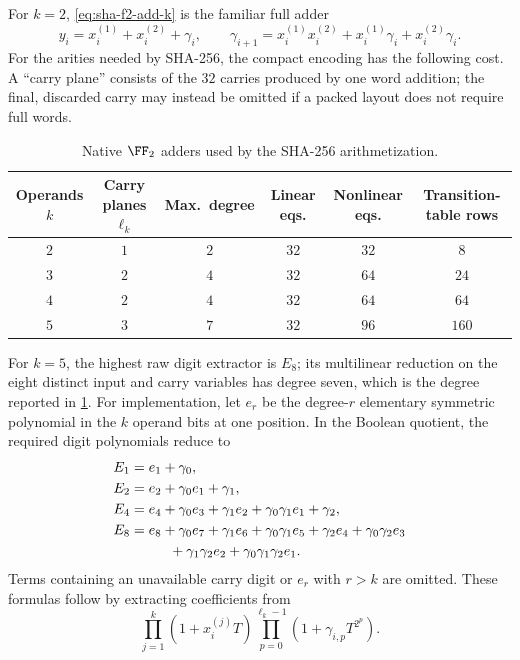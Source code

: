 For $k=2$, \eqref{eq:sha-f2-add-k} is the familiar full adder
\begin{equation}\label{eq:sha-f2-full-adder}
  y_i=x_i^{(1)}+x_i^{(2)}+\gamma_i,
  \qquad
  \gamma_{i+1}
   =x_i^{(1)}x_i^{(2)}
    +x_i^{(1)}\gamma_i+x_i^{(2)}\gamma_i.
\end{equation}
For the arities needed by SHA-256, the compact encoding has the following
cost.  A ``carry plane'' consists of the $32$ carries produced by one word
addition; the final, discarded carry may instead be omitted if a packed
layout does not require full words.
\begin{table}[H]
\centering
\small
\caption{Native $\FF_2$ adders used by the SHA-256 arithmetization.}
\label{tab:sha-f2-adders}
\begin{tabular}{@{}cccccc@{}}
\toprule
Operands $k$ & Carry planes $\ell_k$ & Max.\ degree
  & Linear eqs. & Nonlinear eqs. & Transition-table rows\\
\midrule
$2$ & $1$ & $2$ & $32$ & $32$ & $8$\\
$3$ & $2$ & $4$ & $32$ & $64$ & $24$\\
$4$ & $2$ & $4$ & $32$ & $64$ & $64$\\
$5$ & $3$ & $7$ & $32$ & $96$ & $160$\\
\bottomrule
\end{tabular}
\end{table}
For $k=5$, the highest raw digit extractor is $E_8$; its multilinear
reduction on the eight distinct input and carry variables has degree seven,
which is the degree reported in \cref{tab:sha-f2-adders}.
For implementation, let $e_r$ be the degree-$r$ elementary symmetric
polynomial in the $k$ operand bits at one position.  In the Boolean quotient,
the required digit polynomials reduce to
\begin{equation}\label{eq:sha-f2-reduced-digits}
\begin{aligned}
E_1&=e_1+\gamma_0,\\
E_2&=e_2+\gamma_0e_1+\gamma_1,\\
E_4&=e_4+\gamma_0e_3+\gamma_1e_2
       +\gamma_0\gamma_1e_1+\gamma_2,\\
E_8&=e_8+\gamma_0e_7+\gamma_1e_6+\gamma_0\gamma_1e_5
       +\gamma_2e_4+\gamma_0\gamma_2e_3\\
   &\hspace{2.8em}+\gamma_1\gamma_2e_2
       +\gamma_0\gamma_1\gamma_2e_1.
\end{aligned}
\end{equation}
Terms containing an unavailable carry digit or $e_r$ with $r>k$ are omitted.
These formulas follow by extracting coefficients from
\[
 \prod_{j=1}^k(1+x_i^{(j)}T)
 \prod_{p=0}^{\ell_k-1}(1+\gamma_{i,p}T^{2^p}).
\]

